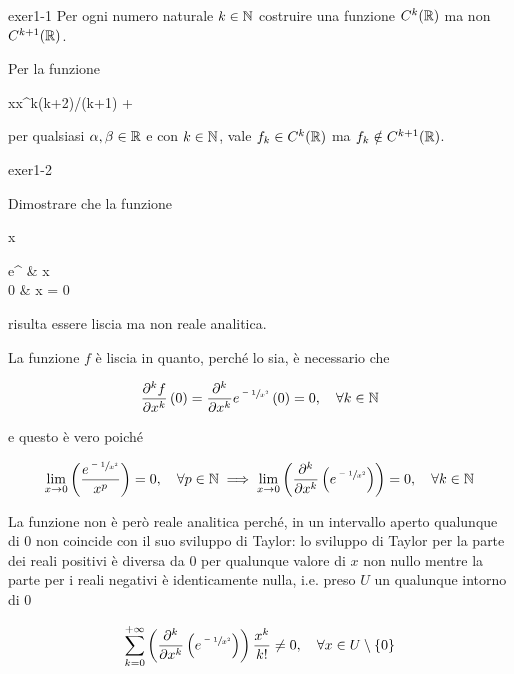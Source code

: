 {exer1-1}
{%
Per ogni numero naturale $ k \in \mathbb{N} $ costruire una funzione $ C^{k}(\mathbb{R}) $ ma non $ C^{k+1}(\mathbb{R}) $. %
}
{
Per la funzione

	{\R}{\R}
	{x}{\alpha x^{k(k+2)/(k+1)} + \beta}

per qualsiasi $ \alpha,\beta \in \mathbb{R} $ e con $ k \in \mathbb{N} $, vale $ f_{k} \in C^{k}(\mathbb{R}) $ ma $ f_{k} \notin C^{k+1}(\mathbb{R}) $.
}


{exer1-2}
{
Dimostrare che la funzione

	{\R}{\R}
	{x}{%
		\begin{cases}
			e^{} & x  \\
			0 & x = 0
		\end{cases}
	}

risulta essere liscia ma non reale analitica.
}
{
La funzione $ f $ è liscia in quanto, perché lo sia, è necessario che

\begin{equation}
	\pdv[k]{f}{x} \, (0) = \pdv[k]{x} e^{\sfrac{-1}{x^{2}}} \, (0) = 0 \qcomma \forall k \in \N
\end{equation}

e questo è vero poiché

\begin{equation}
	\lim_{x \to 0} \left( \dfrac{e^{\sfrac{-1}{x^{2}}}}{x^{p}} \right) = 0 \qcomma \forall p \in \N %
	\implies%
	\lim_{x \to 0} \left( \pdv[k]{x} \left( e^{\sfrac{-1}{x^{2}}} \right) \right) = 0 \qcomma \forall k \in \N
\end{equation}

La funzione non è però reale analitica perché, in un intervallo aperto qualunque di 0 non coincide con il suo sviluppo di Taylor: lo sviluppo di Taylor per la parte dei reali positivi è diversa da 0 per qualunque valore di $ x $ non nullo mentre la parte per i reali negativi è identicamente nulla, i.e. preso $ U $ un qualunque intorno di 0

\begin{equation}
	\sum_{k=0}^{+\infty} \left( \pdv[k]{x} \left( e^{\sfrac{-1}{x^{2}}} \right) \right) \dfrac{x^{k}}{k!} \neq 0 \qcomma \forall x \in U \setminus \{0\}
\end{equation}
}



